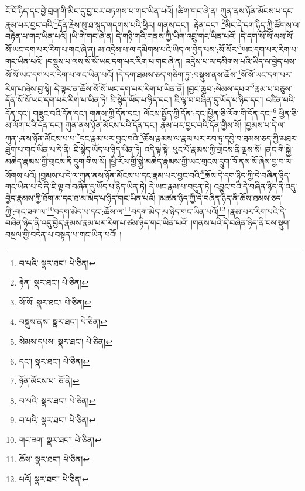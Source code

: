 ངོ་བོ་ཉིད་དང་བྱེ་བྲག་གི་མིང་དུ་བྱ་བར་བཏགས་པ་གང་ཡིན་པའོ། །ཚིག་གང་ཞེ་ན། ཀུན་ནས་ཉོན་མོངས་པ་དང་རྣམ་པར་བྱང་བའི་\footnote{བ་པའི་  སྣར་ཐང་།  པེ་ཅིན། }དོན་རྗེས་སུ་ཐ་སྙད་གདགས་པའི་ཕྱིར། གནས་དང་། :རྟེན་དང་། \footnote{རྟེན་  སྣར་ཐང་།  པེ་ཅིན། }མིང་དེ་དག་ཉིད་ཀྱི་ཚོགས་ལ་བརྟེན་པ་གང་ཡིན་པའོ། །ཡི་གེ་གང་ཞེ་ན། དེ་གཉི་གའི་གནས་ཀྱི་ཡིག་འབྲུ་གང་ཡིན་པའོ། །དེ་དག་སོ་སོ་ལས་སོ་སོ་ཡང་དག་པར་རིག་པ་གང་ཞེ་ན། མ་འདྲེས་པ་ལ་དམིགས་པའི་ཡིད་ལ་བྱེད་པས་:སོ་སོར་\footnote{སོ་སོ་  སྣར་ཐང་།  པེ་ཅིན། }ཡང་དག་པར་རིག་པ་གང་ཡིན་པའོ། །བསྡུས་པ་ལས་སོ་སོ་ཡང་དག་པར་རིག་པ་གང་ཞེ་ན། འདྲེས་པ་ལ་དམིགས་པའི་ཡིད་ལ་བྱེད་པས་སོ་སོ་ཡང་དག་པར་རིག་པ་གང་ཡིན་པའོ། །དེ་དག་ཐམས་ཅད་གཅིག་ཏུ་:བསྡུས་ནས་ཆོས་\footnote{བསྡུས་ནས་  སྣར་ཐང་།  པེ་ཅིན། }སོ་སོ་ཡང་དག་པར་རིག་པ་ཞེས་བྱ་སྟེ། དེ་ལྟར་ན་ཆོས་སོ་སོ་ཡང་དག་པར་རིག་པ་ཡིན་ནོ། །བྱང་ཆུབ་:སེམས་དཔའ་\footnote{སེམས་དཔས་  སྣར་ཐང་།  པེ་ཅིན། }རྣམ་པ་བཅུས་དོན་སོ་སོ་ཡང་དག་པར་རིག་པ་ཡིན་ཏེ། ཇི་སྙེད་ཡོད་པ་ཉིད་དང་། ཇི་ལྟ་བ་བཞིན་དུ་ཡོད་པ་ཉིད་དང་། འཛིན་པའི་དོན་དང་། གཟུང་བའི་དོན་དང་། གནས་ཀྱི་དོན་དང་། ལོངས་སྤྱོད་ཀྱི་དོན་:དང་།ཕྱིན་ཅི་ལོག་གི་དོན་དང་།\footnote{དང་།  སྣར་ཐང་།  པེ་ཅིན། } ཕྱིན་ཅི་མ་ལོག་པའི་དོན་དང་། ཀུན་ནས་ཉོན་མོངས་པའི་དོན་དང་། རྣམ་པར་བྱང་བའི་དོན་གྱིས་སོ། །བྱམས་པ་དེ་ལ་ཀུན་:ནས་ཉོན་མོངས་པ་པ་\footnote{ཉོན་མོངས་པ་  ཅོ་ནེ། }དང་རྣམ་པར་བྱང་བའི་\footnote{བ་པའི་  སྣར་ཐང་།  པེ་ཅིན། }ཆོས་རྣམས་ལ་རྣམ་པར་རབ་ཏུ་དབྱེ་བ་ཐམས་ཅད་ཀྱི་མཐར་ཐུག་པ་གང་ཡིན་པ་དེ་ནི། ཇི་སྙེད་ཡོད་པ་ཉིད་ཡིན་ཏེ། འདི་ལྟ་སྟེ། ཕུང་པོ་རྣམས་ཀྱི་གྲངས་ནི་ལྔས་སོ། །ནང་གི་སྐྱེ་མཆེད་རྣམས་ཀྱི་གྲངས་ནི་དྲུག་གིས་སོ། །ཕྱི་རོལ་གྱི་སྐྱེ་མཆེད་རྣམས་ཀྱི་ཡང་གྲངས་དྲུག་ཁོ་ནས་སོ་ཞེས་བྱ་བ་ལ་སོགས་པའོ། །བྱམས་པ་དེ་ལ་ཀུན་ནས་ཉོན་མོངས་པ་དང་རྣམ་པར་བྱང་བའི་\footnote{བ་པའི་  སྣར་ཐང་།  པེ་ཅིན། }ཆོས་དེ་དག་ཉིད་ཀྱི་དེ་བཞིན་ཉིད་གང་ཡིན་པ་དེ་ནི་ཇི་ལྟ་བ་བཞིན་དུ་ཡོད་པ་ཉིད་ཡིན་ཏེ། དེ་ཡང་རྣམ་པ་བདུན་ཏེ། འབྱུང་བའི་དེ་བཞིན་ཉིད་ནི་འདུ་བྱེད་རྣམས་ཀྱི་ཐོག་མ་དང་ཐ་མ་མེད་པ་ཉིད་གང་ཡིན་པའོ། །མཚན་ཉིད་ཀྱི་དེ་བཞིན་ཉིད་ནི་ཆོས་ཐམས་ཅད་ཀྱི་:གང་ཟག་ལ་\footnote{གང་ཟག་  སྣར་ཐང་།  པེ་ཅིན། }བདག་མེད་པ་དང་:ཆོས་ལ་\footnote{ཆོས་  སྣར་ཐང་།  པེ་ཅིན། }བདག་མེད་:པ་ཉིད་གང་ཡིན་པའོ།\footnote{པའོ།  སྣར་ཐང་།  པེ་ཅིན། } །རྣམ་པར་རིག་པའི་དེ་བཞིན་ཉིད་ནི་འདུ་བྱེད་རྣམས་རྣམ་པར་རིག་པ་ཙམ་ཉིད་གང་ཡིན་པའོ། །གནས་པའི་དེ་བཞིན་ཉིད་ནི་ངས་སྡུག་བསྔལ་གྱི་བདེན་པ་བསྟན་པ་གང་ཡིན་པའོ། །
